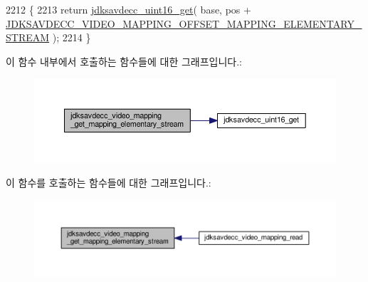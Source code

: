 \begin{DoxyCode}
2212 \{
2213     \textcolor{keywordflow}{return} \hyperlink{group__endian_ga3fbbbc20be954aa61e039872965b0dc9}{jdksavdecc\_uint16\_get}( base, pos + 
      \hyperlink{group__video__mapping_gabea225be2648027acc6ed7f8acf44944}{JDKSAVDECC\_VIDEO\_MAPPING\_OFFSET\_MAPPING\_ELEMENTARY\_STREAM}
       );
2214 \}
\end{DoxyCode}


이 함수 내부에서 호출하는 함수들에 대한 그래프입니다.\+:
\nopagebreak
\begin{figure}[H]
\begin{center}
\leavevmode
\includegraphics[width=350pt]{group__video__mapping_ga1f99ad7682071756397dd4518a566d4b_cgraph}
\end{center}
\end{figure}




이 함수를 호출하는 함수들에 대한 그래프입니다.\+:
\nopagebreak
\begin{figure}[H]
\begin{center}
\leavevmode
\includegraphics[width=350pt]{group__video__mapping_ga1f99ad7682071756397dd4518a566d4b_icgraph}
\end{center}
\end{figure}


